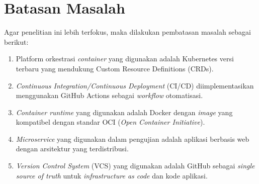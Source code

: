 \vspace{0.5cm}
\section{Batasan Masalah}
Agar penelitian ini lebih terfokus, maka dilakukan pembatasan masalah sebagai berikut:
\begin{enumerate}[label=\alph*., leftmargin=1.5\parindent]
    \item Platform orkestrasi \textit{container} yang digunakan adalah Kubernetes versi terbaru yang mendukung Custom Resource Definitions (CRDs).
    \item \textit{Continuous Integration/Continuous Deployment} (CI/CD) diimplementasikan menggunakan GitHub Actions sebagai \textit{workflow} otomatisasi.
    \item \textit{Container runtime} yang digunakan adalah Docker dengan \textit{image} yang kompatibel dengan standar OCI (\textit{Open Container Initiative}).
    \item \textit{Microservice} yang digunakan dalam pengujian adalah aplikasi berbasis web dengan arsitektur yang terdistribusi.
    \item \textit{Version Control System} (VCS) yang digunakan adalah GitHub sebagai \textit{single source of truth} untuk \textit{infrastructure as code} dan kode aplikasi.
\end{enumerate}
\newpage
